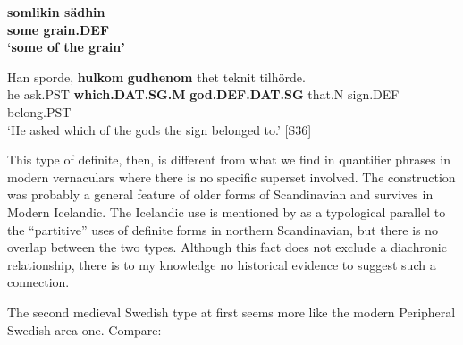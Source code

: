 
\item 


 \ea\label{}\gll\bfseries
somlikin  sädhin\\

\bfseries
some  grain.DEF\\

\glt ‘some of the grain’

\z

\item 


 \ea\label{}
\gll Han  sporde,  \textbf{hulkom} \textbf{gudhenom} thet  teknit  tilhörde.\\


he  ask.PST  \textbf{which.DAT.SG.M} \textbf{god.DEF.DAT.SG} that.N  sign.DEF  belong.PST\\

\glt ‘He asked which of the gods the sign belonged to.’ [S36]

\z

This type of definite, then, is different from what we find in quantifier phrases in modern vernaculars where there is no specific superset involved. The construction was probably a general feature of older forms of Scandinavian and survives in Modern Icelandic. The Icelandic use is mentioned by \citet{Riesler2002} as a typological parallel to the “partitive” uses of definite forms in northern Scandinavian, but there is no overlap between the two types. Although this fact does not exclude a diachronic relationship, there is to my knowledge no historical evidence to suggest such a connection.


The second medieval Swedish type at first seems more like the modern Peripheral Swedish area one. Compare:



